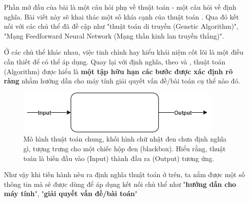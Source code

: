 Phần mở đầu của bài là một câu hỏi phụ về thuật toán - một câu hỏi về định nghĩa. Bài viết này sẽ khai thác một số khía cạnh của thuật toán . Qua đó kết nối với các chủ thể đã đề cập như "thuật toán di truyền (Genetic Algorithm)", "Mạng Feedforward Neural Network (Mạng thần kinh lan truyền thẳng)".

Ở các chủ thể khác nhau, việc tinh chỉnh hay hiểu khái niệm cốt lõi là một điều cần thiết để có thể áp dụng. Quay lại với định nghĩa, theo \cite{algorithmDefinition1} và \cite{algorithmDefinition2}, thuật toán (Algorithm) được hiểu là \textbf{một tập hữu hạn các bước được xác định rõ ràng} nhằm hướng dẫn cho máy tính giải quyết vấn đề/bài toán cụ thể nào đó.

\begin{figure}[h]
	\centering
	\includegraphics{figures/general_algorithm_diagram.png}
	\caption{Mô hình thuật toán chung, khối hình chữ nhật đen chưa định nghĩa gì, tượng trưng cho một chiếc hộp đen (blackbox). Hiểu rằng, thuật toán là biến đầu vào (Input) thành đầu ra (Output) tương ứng.}
	\label{fig:algorithm_architect_general}
\end{figure}

Như vậy khi tiến hành nêu ra định nghĩa thuật toán ở trên, ta nắm được một số thông tin mà sẽ được dùng để áp dụng kết nối chủ thể như "\textbf{hướng dẫn cho máy tính}", "\textbf{giải quyết vấn đề/bài toán}"

